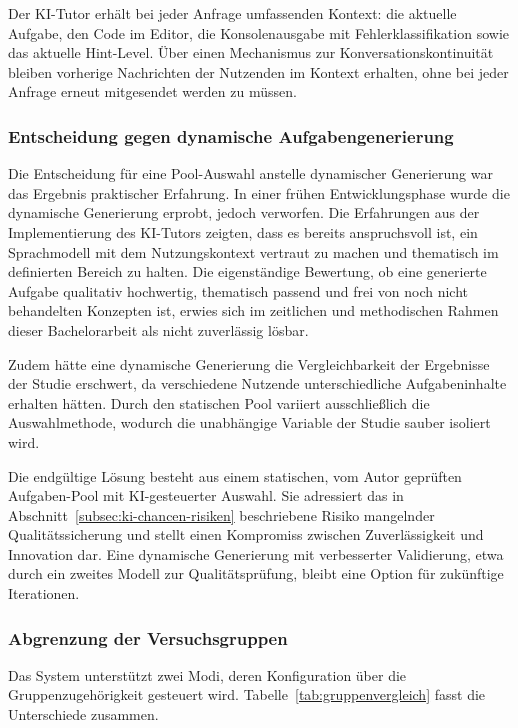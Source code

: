 Der KI-Tutor erhält bei jeder Anfrage umfassenden Kontext: die aktuelle Aufgabe, den Code im Editor, die Konsolenausgabe mit Fehlerklassifikation sowie das aktuelle Hint-Level.
Über einen Mechanismus zur Konversationskontinuität bleiben vorherige Nachrichten der Nutzenden im Kontext erhalten, ohne bei jeder Anfrage erneut mitgesendet werden zu müssen.

\subsubsection{Entscheidung gegen dynamische Aufgabengenerierung}

Die Entscheidung für eine Pool-Auswahl anstelle dynamischer Generierung war das Ergebnis praktischer Erfahrung.
In einer frühen Entwicklungsphase wurde die dynamische Generierung erprobt, jedoch verworfen.
Die Erfahrungen aus der Implementierung des KI-Tutors zeigten, dass es bereits anspruchsvoll ist, ein Sprachmodell mit dem Nutzungskontext vertraut zu machen und thematisch im definierten Bereich zu halten.
Die eigenständige Bewertung, ob eine generierte Aufgabe qualitativ hochwertig, thematisch passend und frei von noch nicht behandelten Konzepten ist, erwies sich im zeitlichen und methodischen Rahmen dieser Bachelorarbeit als nicht zuverlässig lösbar.

Zudem hätte eine dynamische Generierung die Vergleichbarkeit der Ergebnisse der Studie erschwert, da verschiedene Nutzende unterschiedliche Aufgabeninhalte erhalten hätten.
Durch den statischen Pool variiert ausschließlich die Auswahlmethode, wodurch die unabhängige Variable der Studie sauber isoliert wird.

Die endgültige Lösung besteht aus einem statischen, vom Autor geprüften Aufgaben-Pool mit KI-gesteuerter Auswahl. Sie adressiert das in Abschnitt~\ref{subsec:ki-chancen-risiken} beschriebene Risiko mangelnder Qualitätssicherung und stellt einen Kompromiss zwischen Zuverlässigkeit und Innovation dar.
Eine dynamische Generierung mit verbesserter Validierung, etwa durch ein zweites Modell zur Qualitätsprüfung, bleibt eine Option für zukünftige Iterationen.

\subsubsection{Abgrenzung der Versuchsgruppen}

Das System unterstützt zwei Modi, deren Konfiguration über die Gruppenzugehörigkeit gesteuert wird.
Tabelle~\ref{tab:gruppenvergleich} fasst die Unterschiede zusammen.

